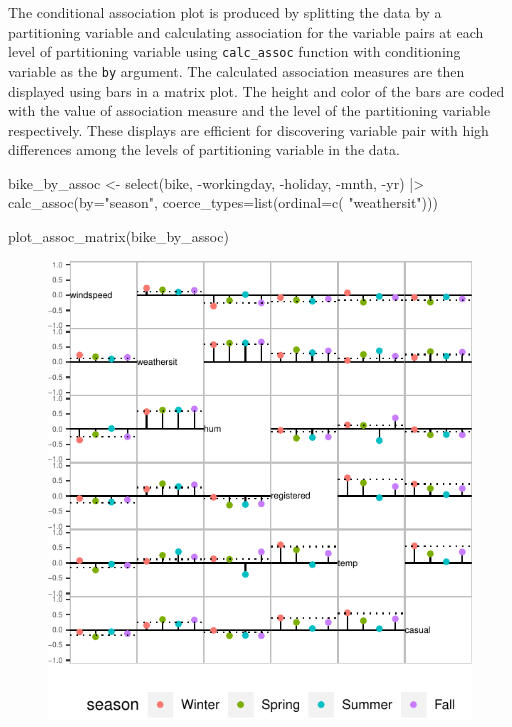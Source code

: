 The conditional association plot is produced by splitting the data by a
partitioning variable and calculating association for the variable pairs
at each level of partitioning variable using \texttt{calc\_assoc}
function with conditioning variable as the \texttt{by} argument. The
calculated association measures are then displayed using bars in a
matrix plot. The height and color of the bars are coded with the value
of association measure and the level of the partitioning variable
respectively. These displays are efficient for discovering variable pair
with high differences among the levels of partitioning variable in the
data.

\begin{Schunk}
\begin{Sinput}
bike_by_assoc <- select(bike, -workingday, -holiday, -mnth, -yr) |>
  calc_assoc(by="season", 
                  coerce_types=list(ordinal=c( "weathersit")))


plot_assoc_matrix(bike_by_assoc)
\end{Sinput}
\begin{figure}

{\centering \includegraphics{rj_paper_files/figure-latex/cond-assoc-1} 

}


\end{figure}
\end{Schunk}
